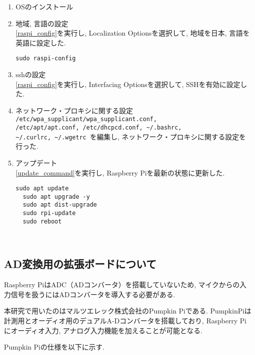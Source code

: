 \begin{enumerate}
\renewcommand{\labelenumi}{(\arabic{enumi})}
\item
  OSのインストール
\item
  地域, 言語の設定 \\
  \ref{raspi_config}を実行し, Localization Optionsを選択して, 地域を日本, 言語を英語に設定した. 
  \begin{lstlisting}[caption=Raspberry Piのコンフィグレーションツールの起動コマンド, label=raspi_config]
  sudo raspi-config
  \end{lstlisting}
\item
  sshの設定 \\
  \ref{raspi_config}を実行し, Interfacing Optionsを選択して, SSHを有効に設定した. 
\item
  ネットワーク・プロキシに関する設定 \\
  \texttt{/etc/wpa\_supplicant/wpa\_supplicant.conf, \\
  /etc/apt/apt.conf, 
  /etc/dhcpcd.conf, 
  \textasciitilde/.bashrc, \\
  \textasciitilde/.curlrc, 
  \textasciitilde/.wgetrc
  }を編集し, ネットワーク・プロキシに関する設定を行った. 

\item
  アップデート \\
  \ref{update_command}を実行し, Raspberry Piを最新の状態に更新した. 

  \begin{lstlisting}[caption=Raspberry Piのアップデートコマンド,label=update_command]
  sudo apt update 
  sudo apt upgrade -y 
  sudo apt dist-upgrade
  sudo rpi-update
  sudo reboot
  \end{lstlisting}
\end{enumerate}

\
\subsection{AD変換用の拡張ボードについて}\label{about-adc}

Raspberry PiはADC（ADコンバータ）を搭載していないため, マイクからの入力信号を扱うにはADコンバータを導入する必要がある. 

本研究で用いたのはマルツエレック株式会社のPumpkin Piである. PumpkinPiは計測用とオーディオ用のデュアルA-Dコンバータを搭載しており, Raspberry Piにオーディオ入力, アナログ入力機能を加えることが可能となる. 

Pumpkin Piの仕様を以下に示す. 

